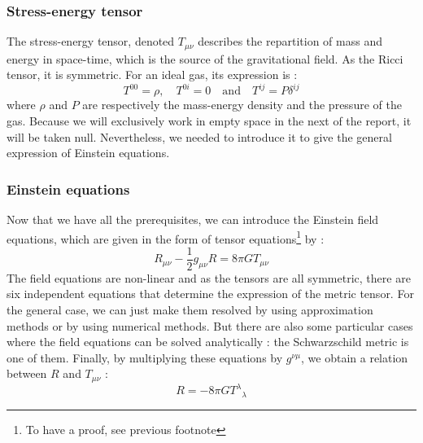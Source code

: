 \subsubsection{Stress-energy tensor}

The stress-energy tensor, denoted $T_{\mu\nu}$ describes the repartition of mass and energy in space-time,
which is the source of the gravitational field. As the Ricci tensor, it is symmetric.
For an ideal gas, its expression is :
%
\begin{equation}
 T^{00} = \rho, \quad T^{0i} = 0 \quad  \mathrm{and} \quad T^{ij} = P\delta^{ij}
\end{equation}
%
where $\rho$ and $P$ are respectively the mass-energy density and the pressure of the gas.
Because we will exclusively work in empty space in the next of the report, it will be taken null.
Nevertheless, we needed to introduce it to give the general expression of Einstein equations.

\subsubsection{Einstein equations}

Now that we have all the prerequisites, we can introduce the Einstein field equations, which are given in the form of tensor
equations\footnote{To have a proof, see previous footnote} by :
%
\begin{equation}\label{Einstein}
	R_{\mu\nu}-\frac{1}{2}g_{\mu\nu}R=8\pi G T_{\mu\nu}
\end{equation}
%
The field equations are non-linear and as the tensors are all symmetric,
there are six independent equations that determine the expression of the metric tensor.
For the general case, we can just make them resolved by
using approximation methods or by using numerical methods. But there are also some
particular cases where the field equations can be solved analytically :
the Schwarzschild metric is one of them.
Finally, by multiplying these equations by $g^{\nu\mu}$, we obtain a relation between $R$ and $T_{\mu\nu}$ :
%
\begin{equation}\label{scalar_curvature_stress_energy}
 R = - 8\pi G {T^\lambda}_\lambda
\end{equation}
